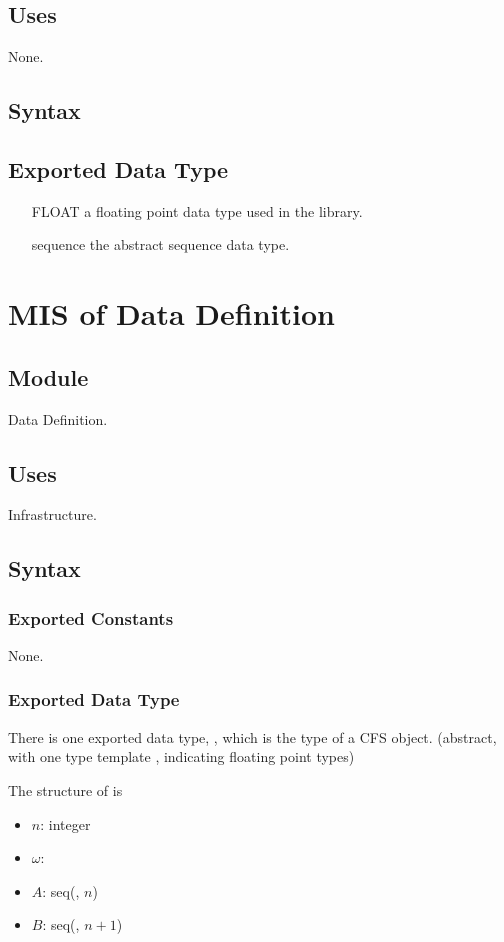 \documentclass[12pt, titlepage]{article}
\begin{document}
\subsection{Uses}

None.
\subsection{Syntax}
\subsection{Exported Data Type}
\begin{itemize}
	\item[FLOAT] a floating point data type used in the library.
	\item [sequence] the abstract sequence data type.
\end{itemize}

\section{MIS of Data Definition} \label{MIS:DataDef}
\subsection{Module}

Data Definition.

\subsection{Uses}

Infrastructure.

\subsection{Syntax}

\subsubsection{Exported Constants}
None.
\subsubsection{Exported Data Type}
There is one exported data type, , which is the type of a CFS
object. (abstract, with one type template , indicating floating point
types)

The structure of  is
\begin{itemize}
	\item $n$: integer
	\item $\omega$: 
	\item $A$: seq(, $n$)
	\item $B$: seq(, $n+1$)
\end{itemize}
\end{document}
